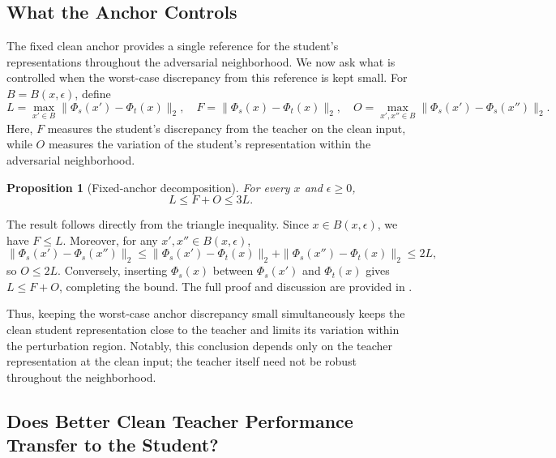 \documentclass{article} %
\theoremstyle{plain}
\newtheorem{proposition}{Proposition}
\begin{document}
\subsection{What the Anchor Controls}
\label{sec:decomp}

The fixed clean anchor provides a single reference for the student's
representations throughout the adversarial neighborhood. We now ask what is
controlled when the worst-case discrepancy from this reference is kept small.
For \(B=B(x,\epsilon)\), define
\begin{equation}
L=\max_{x'\in B}\|\Phi_s(x')-\Phi_t(x)\|_2,\quad
F=\|\Phi_s(x)-\Phi_t(x)\|_2,\quad
O=\max_{x',x''\in B}\|\Phi_s(x')-\Phi_s(x'')\|_2.
\label{eqn:LFO}
\end{equation}
Here, \(F\) measures the student's discrepancy from the teacher on the clean
input, while \(O\) measures the variation of the student's representation
within the adversarial neighborhood.

\begin{proposition}[Fixed-anchor decomposition]\label{prop:decomp}
For every \(x\) and \(\epsilon\ge0\),
\begin{equation}
L\le F+O\le3L.
\label{eqn:decomp}
\end{equation}
\end{proposition}

The result follows directly from the triangle inequality. Since
\(x\in B(x,\epsilon)\), we have \(F\le L\). Moreover, for any
\(x',x''\in B(x,\epsilon)\),
\begin{equation}
\|\Phi_s(x')-\Phi_s(x'')\|_2
\le
\|\Phi_s(x')-\Phi_t(x)\|_2
+
\|\Phi_s(x'')-\Phi_t(x)\|_2
\le 2L,
\end{equation}
so \(O\le2L\). Conversely, inserting \(\Phi_s(x)\) between
\(\Phi_s(x')\) and \(\Phi_t(x)\) gives \(L\le F+O\), completing the
bound. The full proof and discussion are provided in
.

Thus, keeping the worst-case anchor discrepancy small simultaneously keeps
the clean student representation close to the teacher and limits its variation
within the perturbation region. Notably, this conclusion depends only on the
teacher representation at the clean input; the teacher itself need not be
robust throughout the neighborhood.


\subsection{Does Better Clean Teacher Performance Transfer to the Student?}
\label{sec:teacher_transfer}
\end{document}

